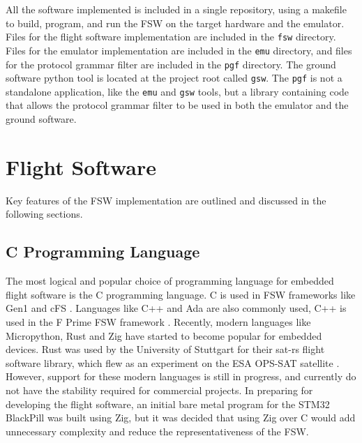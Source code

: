 \documentclass[../report.tex]{subfiles}
\begin{document}



All the software implemented is included in a single repository, using a
makefile to build, program, and run the FSW on the target hardware and the
emulator. Files for the flight software implementation are included in the
\lstinline|fsw| directory. Files for the emulator implementation are included
in the \lstinline|emu| directory, and files for the protocol grammar filter
are included in the \lstinline|pgf| directory. The ground software python tool
is located at the project root called \lstinline|gsw|. The \lstinline|pgf| is
not a standalone application, like the \lstinline|emu| and \lstinline|gsw|
tools, but a library containing code that allows the protocol grammar filter to
be used in both the emulator and the ground software.

\section{Flight Software}

Key features of the FSW implementation are outlined and discussed in the
following sections.

\subsection{C Programming Language} %

The most logical and popular choice of programming language for embedded flight
software is the C programming language. C is used in FSW frameworks like Gen1
and cFS \citep{Bal_FSDK, Nasa_cFS}. Languages like C++ and Ada are also
commonly used, C++ is used in the F Prime FSW framework \citep{Nasa_fprime}.
Recently, modern languages like Micropython, Rust and Zig have started to
become popular for embedded devices. Rust was used by the University of
Stuttgart for their sat-rs flight software library, which flew as an experiment
on the ESA OPS-SAT satellite \citep{satrs, opsat}. However, support for these
modern languages is still in progress, and currently do not have the stability
required for commercial projects. In preparing for developing the flight
software, an initial bare metal program for the STM32 BlackPill was built using
Zig, but it was decided that using Zig over C would add unnecessary complexity
and reduce the representativeness of the FSW.
\end{document}
